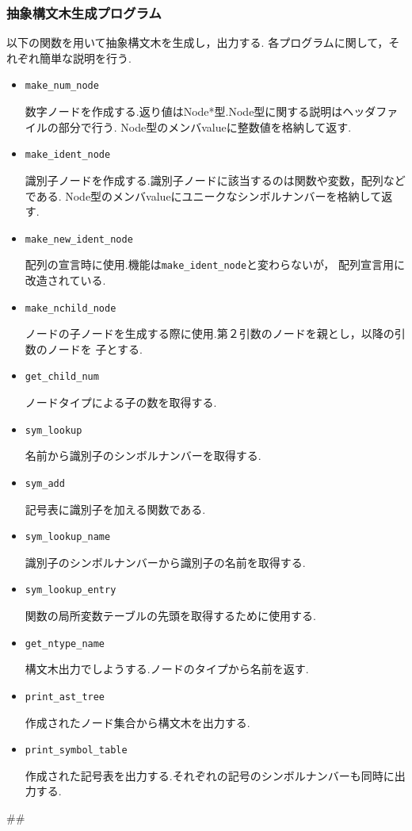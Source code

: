 \documentclass[a4paper,11pt]{jarticle}
\begin{document}
{\subsubsection{抽象構文木生成プログラム}
以下の関数を用いて抽象構文木を生成し，出力する.
各プログラムに関して，それぞれ簡単な説明を行う.
\begin{itemize}
\item \verb|make_num_node|
\begin{itemize}
数字ノードを作成する.返り値はNode*型.Node型に関する説明はヘッダファイルの部分で行う.
Node型のメンバvalueに整数値を格納して返す.
\end{itemize}
\item \verb|make_ident_node|
\begin{itemize}
識別子ノードを作成する.識別子ノードに該当するのは関数や変数，配列などである.
Node型のメンバvalueにユニークなシンボルナンバーを格納して返す.
\end{itemize}
\item \verb|make_new_ident_node|
\begin{itemize}
配列の宣言時に使用.機能は\verb|make_ident_node|と変わらないが，
配列宣言用に改造されている.
\end{itemize}
\item \verb|make_nchild_node|
\begin{itemize}
ノードの子ノードを生成する際に使用.第２引数のノードを親とし，以降の引数のノードを
子とする.
\end{itemize}
\item \verb|get_child_num|
\begin{itemize}
ノードタイプによる子の数を取得する.
\end{itemize}
\item \verb|sym_lookup|
\begin{itemize}
名前から識別子のシンボルナンバーを取得する.
\end{itemize}
\item \verb|sym_add|
\begin{itemize}
記号表に識別子を加える関数である.
\end{itemize}
\item \verb|sym_lookup_name|
\begin{itemize}
識別子のシンボルナンバーから識別子の名前を取得する.
\end{itemize}
\item \verb|sym_lookup_entry|
\begin{itemize}
関数の局所変数テーブルの先頭を取得するために使用する.
\end{itemize}
\item \verb|get_ntype_name|
\begin{itemize}
構文木出力でしようする.ノードのタイプから名前を返す.
\end{itemize}
\item \verb|print_ast_tree|
\begin{itemize}
作成されたノード集合から構文木を出力する.
\end{itemize}
\item \verb|print_symbol_table|
\begin{itemize}
作成された記号表を出力する.それぞれの記号のシンボルナンバーも同時に出力する.
\end{itemize}
\end{itemize}
##
}
\end{document}

